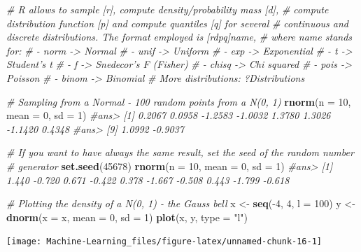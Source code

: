 \documentclass[]{book}
\newenvironment{Shaded}{\begin{snugshade}}{\end{snugshade}}
\newcommand{\KeywordTok}[1]{\textcolor[rgb]{0.13,0.29,0.53}{\textbf{{#1}}}}
\newcommand{\DataTypeTok}[1]{\textcolor[rgb]{0.13,0.29,0.53}{{#1}}}
\newcommand{\DecValTok}[1]{\textcolor[rgb]{0.00,0.00,0.81}{{#1}}}
\newcommand{\StringTok}[1]{\textcolor[rgb]{0.31,0.60,0.02}{{#1}}}
\newcommand{\CommentTok}[1]{\textcolor[rgb]{0.56,0.35,0.01}{\textit{{#1}}}}
\newcommand{\NormalTok}[1]{{#1}}
\begin{document}
\begin{Shaded}
\begin{Highlighting}[]
\CommentTok{# R allows to sample [r], compute density/probability mass [d],}
\CommentTok{# compute distribution function [p] and compute quantiles [q] for several}
\CommentTok{# continuous and discrete distributions. The format employed is [rdpq]name,}
\CommentTok{# where name stands for:}
\CommentTok{# - norm -> Normal}
\CommentTok{# - unif -> Uniform}
\CommentTok{# - exp -> Exponential}
\CommentTok{# - t -> Student's t}
\CommentTok{# - f -> Snedecor's F (Fisher)}
\CommentTok{# - chisq -> Chi squared}
\CommentTok{# - pois -> Poisson}
\CommentTok{# - binom -> Binomial}
\CommentTok{# More distributions: ?Distributions}


\CommentTok{# Sampling from a Normal - 100 random points from a N(0, 1)}
\KeywordTok{rnorm}\NormalTok{(}\DataTypeTok{n =} \DecValTok{10}\NormalTok{, }\DataTypeTok{mean =} \DecValTok{0}\NormalTok{, }\DataTypeTok{sd =} \DecValTok{1}\NormalTok{)}
\CommentTok{#ans>  [1]  0.2067  0.0958 -1.2583 -1.0032  1.3780  1.3026 -1.1420  0.4348}
\CommentTok{#ans>  [9]  1.0992 -0.9037}

\CommentTok{# If you want to have always the same result, set the seed of the random number}
\CommentTok{# generator}
\KeywordTok{set.seed}\NormalTok{(}\DecValTok{45678}\NormalTok{)}
\KeywordTok{rnorm}\NormalTok{(}\DataTypeTok{n =} \DecValTok{10}\NormalTok{, }\DataTypeTok{mean =} \DecValTok{0}\NormalTok{, }\DataTypeTok{sd =} \DecValTok{1}\NormalTok{)}
\CommentTok{#ans>  [1]  1.440 -0.720  0.671 -0.422  0.378 -1.667 -0.508  0.443 -1.799 -0.618}

\CommentTok{# Plotting the density of a N(0, 1) - the Gauss bell}
\NormalTok{x <-}\StringTok{ }\KeywordTok{seq}\NormalTok{(-}\DecValTok{4}\NormalTok{, }\DecValTok{4}\NormalTok{, }\DataTypeTok{l =} \DecValTok{100}\NormalTok{)}
\NormalTok{y <-}\StringTok{ }\KeywordTok{dnorm}\NormalTok{(}\DataTypeTok{x =} \NormalTok{x, }\DataTypeTok{mean =} \DecValTok{0}\NormalTok{, }\DataTypeTok{sd =} \DecValTok{1}\NormalTok{)}
\KeywordTok{plot}\NormalTok{(x, y, }\DataTypeTok{type =} \StringTok{"l"}\NormalTok{)}
\end{Highlighting}
\end{Shaded}

\begin{center}\texttt{[image: Machine-Learning\_files/figure-latex/unnamed-chunk-16-1]} \end{center}
\end{document}
